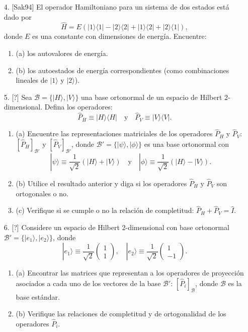 \documentclass[a4paper,12pt]{article}
\begin{document}
\begin{enumerate}
    \item [4.] [Sak94] El operador Hamiltoniano para un sistema de dos estados está dado por
    $$
    \hat{H} = E (|1\rangle\langle 1| - |2\rangle\langle 2| + |1\rangle\langle 2| + |2\rangle\langle 1|),
    $$
    donde $E$ es una constante con dimensiones de energía. Encuentre:
    \begin{enumerate}
        \item (a) los autovalores de energía.
        \item (b) los autoestados de energía correspondientes (como combinaciones lineales de $|1\rangle$ y $|2\rangle$).
    \end{enumerate}

    \item [5.] [?] Sea $\mathcal{B} = \{|H\rangle, |V\rangle\}$ una base ortonormal de un espacio de Hilbert 2-dimensional. Defina los operadores:
    $$
    \hat{P}_H \equiv |H\rangle\langle H| \quad \text{y} \quad \hat{P}_V \equiv |V\rangle\langle V|.
    $$
    \begin{enumerate}
        \item (a) Encuentre las representaciones matriciales de los operadores $\hat{P}_H$ y $\hat{P}_V$: $[\hat{P}_H]_{\mathcal{B}'}$ y $[\hat{P}_V]_{\mathcal{B}'}$, donde $\mathcal{B}' = \{|\psi\rangle, |\phi\rangle\}$ es una base ortonormal con
        $$
        |\psi\rangle \equiv \frac{1}{\sqrt{2}} (|H\rangle + |V\rangle) \quad \text{y} \quad |\phi\rangle \equiv \frac{1}{\sqrt{2}} (|H\rangle - |V\rangle).
        $$
        \item (b) Utilice el resultado anterior y diga si los operadores $\hat{P}_H$ y $\hat{P}_V$ son ortogonales o no.
        \item (c) Verifique si se cumple o no la relación de completitud: $\hat{P}_H + \hat{P}_V = \hat{I}$.
    \end{enumerate}

    \item [6.] [?] Considere un espacio de Hilbert 2-dimensional con base ortonormal $\mathcal{B}' = \{|e_1\rangle, |e_2\rangle\}$, donde
    $$
    |e_1\rangle \equiv \frac{1}{\sqrt{2}} \begin{pmatrix} 1 \\ 1 \end{pmatrix}, \quad |e_2\rangle \equiv \frac{1}{\sqrt{2}} \begin{pmatrix} 1 \\ -1 \end{pmatrix}.
    $$
    \begin{enumerate}
        \item (a) Encontrar las matrices que representan a los operadores de proyección asociados a cada uno de los vectores de la base $\mathcal{B}'$: $[\hat{P}_i]_{\mathcal{B}}$, donde $\mathcal{B}$ es la base estándar.
        \item (b) Verifique las relaciones de completitud y de ortogonalidad de los operadores $\hat{P}_i$.
    \end{enumerate}
\end{enumerate}
\end{document}
